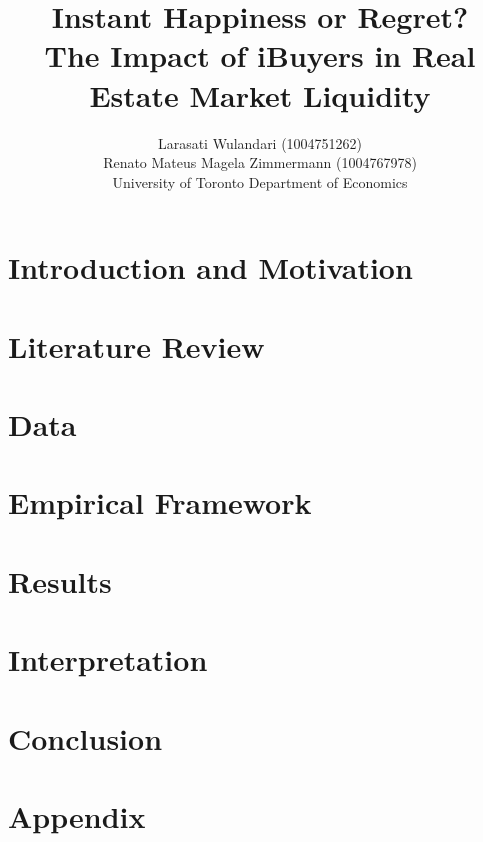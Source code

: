 \documentclass{article}
\title{Instant Happiness or Regret? \\
\Large The Impact of iBuyers in Real Estate Market Liquidity \\
}
\author{
    Larasati Wulandari (1004751262) \\
    Renato Mateus Magela Zimmermann (1004767978)    \\
    University of Toronto Department of Economics
}
\begin{document}
\doublespacing

\maketitle




\section{Introduction and Motivation}



\section{Literature Review}




%

\section{Data}



\section{Empirical Framework}\label{empirical_framework}



\section{Results}



\section{Interpretation}



\section{Conclusion}



\medskip
\printbibliography

\pagebreak
\onecolumn

\section{Appendix}


\end{document}

